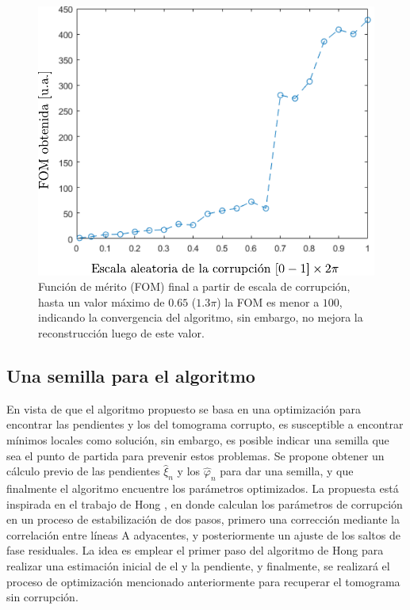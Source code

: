 \begin{figure}
	\centering
	\includegraphics[width=0.4\linewidth]{img/chap4/FOM_over_corrupt_scale}
	\caption[Función de mérito final a partir de escala de corrupción.]{Función de mérito (FOM) final a partir de escala de corrupción, hasta un valor máximo de $0.65$ ($1.3\pi$) la FOM es menor a $100$, indicando la convergencia del algoritmo, sin embargo, no mejora la reconstrucción luego de este valor.}
	\label{fig:FOM_over_corrupt_scale}
\end{figure}

\subsection{Una semilla para el algoritmo}
\label{subsec:semilla}


En vista de que el algoritmo propuesto se basa en una optimización para encontrar las pendientes y los \offset del tomograma corrupto, es susceptible a encontrar mínimos locales como solución, sin embargo, es posible indicar una semilla que sea el punto de partida para prevenir estos problemas. Se propone obtener un cálculo previo de las pendientes $\hat{\xi}_n$ y los \offset $\hat{\varphi}_n$ para dar una semilla, y que finalmente el algoritmo encuentre los parámetros optimizados. La propuesta está inspirada en el trabajo de Hong \etal \cite{Hong2012}, en donde calculan los parámetros de corrupción en un proceso de estabilización de dos pasos, primero una corrección mediante la correlación entre líneas A adyacentes, y posteriormente un ajuste de los saltos de fase residuales. La idea es emplear el primer paso del algoritmo de Hong \etal para realizar una estimación inicial de el \offset y la pendiente, y finalmente, se realizará el proceso de optimización mencionado anteriormente para recuperar el tomograma sin corrupción. 

